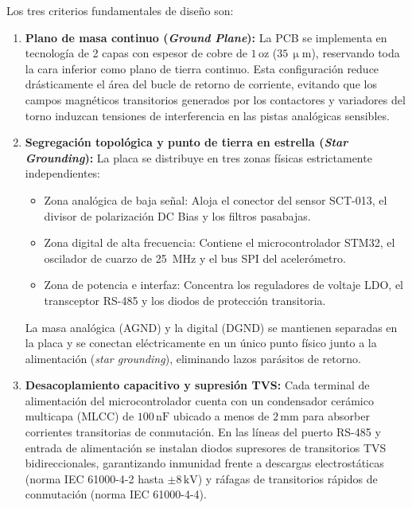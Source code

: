 Los tres criterios fundamentales de diseño son:
\begin{enumerate}
    \item \textbf{Plano de masa continuo (\textit{Ground Plane}):} La PCB se implementa en tecnología de 2 capas con espesor de cobre de $1\,\text{oz}$ ($35\,\upmu\text{m}$), reservando toda la cara inferior como plano de tierra continuo. Esta configuración reduce drásticamente el área del bucle de retorno de corriente, evitando que los campos magnéticos transitorios generados por los contactores y variadores del torno induzcan tensiones de interferencia en las pistas analógicas sensibles.
    \item \textbf{Segregación topológica y punto de tierra en estrella (\textit{Star Grounding}):} La placa se distribuye en tres zonas físicas estrictamente independientes:
    \begin{itemize}
        \item Zona analógica de baja señal: Aloja el conector del sensor SCT-013, el divisor de polarización DC Bias y los filtros pasabajas.
        \item Zona digital de alta frecuencia: Contiene el microcontrolador STM32, el oscilador de cuarzo de 25~MHz y el bus SPI del acelerómetro.
        \item Zona de potencia e interfaz: Concentra los reguladores de voltaje LDO, el transceptor RS-485 y los diodos de protección transitoria.
    \end{itemize}
    La masa analógica (AGND) y la digital (DGND) se mantienen separadas en la placa y se conectan eléctricamente en un único punto físico junto a la alimentación (\textit{star grounding}), eliminando lazos parásitos de retorno.
    \item \textbf{Desacoplamiento capacitivo y supresión TVS:} Cada terminal de alimentación del microcontrolador cuenta con un condensador cerámico multicapa (MLCC) de $100\,\text{nF}$ ubicado a menos de $2\,\text{mm}$ para absorber corrientes transitorias de conmutación. En las líneas del puerto RS-485 y entrada de alimentación se instalan diodos supresores de transitorios TVS bidireccionales, garantizando inmunidad frente a descargas electrostáticas (norma IEC 61000-4-2 hasta $\pm 8\,\text{kV}$) y ráfagas de transitorios rápidos de conmutación (norma IEC 61000-4-4).
\end{enumerate}
